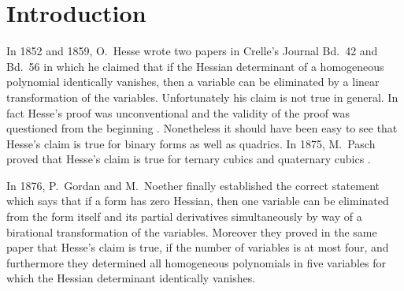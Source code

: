 \documentclass[12pt]{article}
\theoremstyle{definition}
\theoremstyle{remark}
\begin{document}

\begin{bf}
\tableofcontents
\end{bf}

\section{Introduction}

In 1852 and 1859, O.\  Hesse wrote two papers in Crelle's Journal Bd.\ 42 and Bd.\ 56 in  
which he claimed that if the Hessian determinant of a homogeneous polynomial identically vanishes, 
then a variable can be eliminated by  a linear transformation of the variables. 
Unfortunately his claim is not true in general. 
In fact  Hesse's  proof was unconventional and the validity of the proof was questioned 
from the beginning \cite{GNzzz}.  Nonetheless it should have been  
easy to see that Hesse's claim is true for  binary forms as well as quadrics.    
In 1875, M.\ Pasch proved that Hesse's claim is true for ternary cubics and quaternary 
cubics   \cite{moritzPasch}. 

In 1876, P.\ Gordan and M.\ Noether \cite{GNzzz} finally established the correct 
statement which says that if a form has zero Hessian, then one variable 
can be eliminated from the form itself and its partial derivatives simultaneously
by way of a birational transformation of the variables.  
Moreover they proved in the same paper  that Hesse's claim is true, 
if the number of variables  is at most four, 
and furthermore  they determined  all homogeneous polynomials in  
five variables for which the Hessian determinant identically vanishes.  
\end{document}
